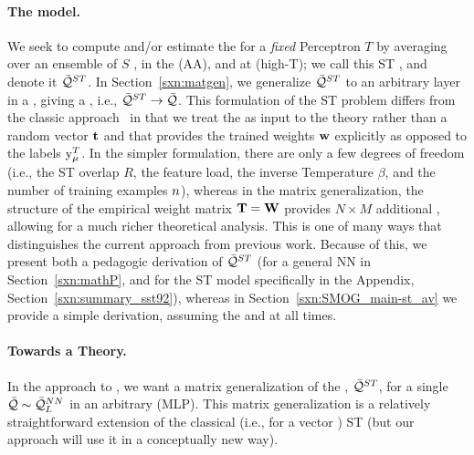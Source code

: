 \paragraph{The \StudentTeacher model.}
We seek to compute and/or estimate the \AverageGeneralizationAccuracy for a \emph{fixed} \Teacher Perceptron $T$
by averaging over an ensemble of \Student $S$ \Perceptrons, in the \AnnealedApproximation (AA), and at
\HighTemperature (high-T); we call this ST \ModelQuality, and denote it $\bar{\mathcal{Q}}^{ST}$.
In Section~\ref{sxn:matgen}, we generalize $\bar{\mathcal{Q}}^{ST}$ to an
arbitrary layer in a \MultiLayerPerceptron, giving a \LayerQuality, i.e., $\bar{\mathcal{Q}}^{ST}\rightarrow\bar{\mathcal{Q}}$.
 This formulation of the ST problem differs from the classic approach~\cite{SST92,engel2001statistical} in that
we treat the \Teacher as input to the theory rather than a random vector ${\mathbf{t}}$
and that \Teacher provides the trained weights ${\mathbf{w}}$ explicitly as opposed
to the labels $\mathrm{y}_{\mu}^{T}$.
In the simpler \Perceptron formulation, there are only a few degrees of freedom (i.e., the ST overlap $R$, the feature load, the inverse Temperature $\beta$, and the number of training examples $n$), whereas in the matrix generalization,
the structure of the empirical \Teacher weight matrix  ${\mathbf{T}}={\mathbf{W}}$ provides $N\times M$ additional ,
allowing for a much richer theoretical analysis.
This is one of many ways that distinguishes the current approach from previous work.
Because of this, we present both a pedagogic derivation of $\bar{\mathcal{Q}}^{ST}$
(for a general NN in Section~\ref{sxn:mathP}, and for the ST model specifically
in the Appendix, Section~\ref{sxn:summary_sst92}), whereas in
Section~\ref{sxn:SMOG_main-st_av} we provide a simple derivation, assuming
the \AnnealedApproximation and \HighTemperature at all times.

\paragraph{Towards a \SemiEmpirical Theory.}
In the \SETOL approach to \STATMECH, we want a matrix generalization of the \StudentTeacher \ModelQuality, $\bar{\mathcal{Q}}^{ST}$, for a single \LayerQuality
$\bar{\mathcal{Q}}\sim\bar{\mathcal{Q}}^{NN}_{L}$ in an arbitrary \MultiLayerPerceptron (MLP).
This matrix generalization is a relatively straightforward extension of the classical (i.e., for a vector \Teacher) \SMOG ST \ModelQuality (but our \SETOL approach will use it in a conceptually new way).

